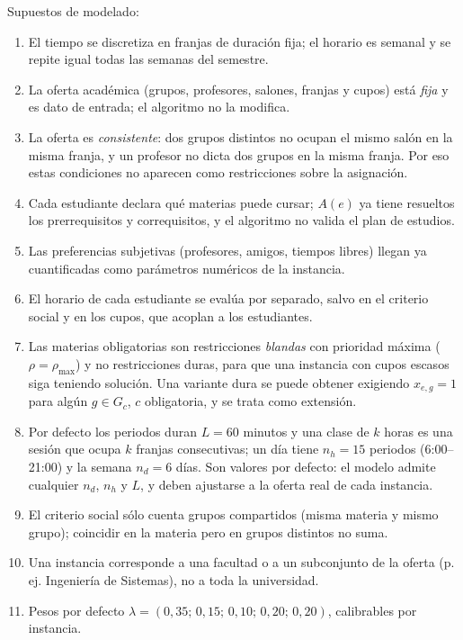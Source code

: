 \documentclass[11pt,letterpaper]{article}
\theoremstyle{definition}
\theoremstyle{remark}
\theoremstyle{plain}
\begin{document}
Supuestos de modelado:
\begin{enumerate}[label=(S\arabic*),ref=S\arabic*]
  \item El tiempo se discretiza en franjas de duración fija; el horario es
        semanal y se repite igual todas las semanas del semestre.
  \item La oferta académica (grupos, profesores, salones, franjas y cupos)
        está \emph{fija} y es dato de entrada; el algoritmo no la modifica.
  \item\label{s:consistente} La oferta es \emph{consistente}: dos grupos
        distintos no ocupan el mismo salón en la misma franja, y un profesor
        no dicta dos grupos en la misma franja. Por eso estas condiciones no
        aparecen como restricciones sobre la asignación.
  \item Cada estudiante declara qué materias puede cursar; $A(e)$ ya tiene
        resueltos los prerrequisitos y correquisitos, y el algoritmo no valida
        el plan de estudios.
  \item Las preferencias subjetivas (profesores, amigos, tiempos libres)
        llegan ya cuantificadas como parámetros numéricos de la instancia.
  \item El horario de cada estudiante se evalúa por separado, salvo en el
        criterio social y en los cupos, que acoplan a los estudiantes.
  \item Las materias obligatorias son restricciones \emph{blandas} con
        prioridad máxima ($\rho=\rho_{\max}$) y no restricciones duras, para
        que una instancia con cupos escasos siga teniendo solución. Una
        variante dura se puede obtener exigiendo $x_{e,g}=1$ para algún
        $g\in G_c$, $c$ obligatoria, y se trata como extensión.
  \item Por defecto los periodos duran $L=60$ minutos y una clase de $k$
        horas es una sesión que ocupa $k$ franjas consecutivas; un día tiene
        $n_h=15$ periodos (6:00--21:00) y la semana $n_d=6$ días. Son valores
        por defecto: el modelo admite cualquier $n_d$, $n_h$ y $L$, y deben
        ajustarse a la oferta real de cada instancia.
  \item El criterio social sólo cuenta grupos compartidos (misma materia y
        mismo grupo); coincidir en la materia pero en grupos distintos no suma.
  \item Una instancia corresponde a una facultad o a un subconjunto de la
        oferta (p.\,ej. Ingeniería de Sistemas), no a toda la universidad.
  \item\label{s:pesos} Pesos por defecto
        $\lambda=(0{,}35;\,0{,}15;\,0{,}10;\,0{,}20;\,0{,}20)$, calibrables por
        instancia.
\end{enumerate}
\end{document}
